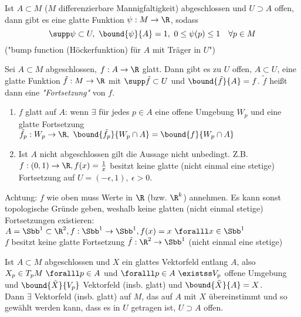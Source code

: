 \begin{lem}\lecture
	Ist $ A \subset M $ ($M$ differenzierbare Mannigfaltigkeit) abgeschlossen und $U \supset A$ offen, dann gibt es eine glatte Funktion $\psi: M \to \R$, sodass
	\[ \supp \psi \subset U,\ \bound{\psi}{A} = 1,\ 0 \leq \psi(p) \leq 1 \quad \forall p \in M \]
	("bump function (Höckerfunktion) für $A$ mit Träger in $U$")
\end{lem}

\begin{lem}
	Sei $A \subset M$ abgeschlossen, $ f: A \to \R $ glatt. Dann gibt es zu $U$ offen, $A \subset U$, eine glatte Funktion $\tilde{f}: M \to \R$ mit $ \supp \tilde{f} \subset U $ und $ \bound{\tilde{f}}{A} = f $. $\tilde{f}$ heißt dann eine \emph{"Fortsetzung"} von $f$.
\end{lem}

\begin{rem*}
	\begin{enumerate}[label={\roman*})]
		\item $f$ glatt auf $A$: wenn $\exists$ für jedes $p \in A$ eine offene Umgebung $W_p$ und eine glatte Fortsetzung $ \tilde{f}_p: W_p \to \R,\ \bound{\tilde{f}_p}{W_p \cap A} = \bound{f}{W_p\cap A} $
		\item Ist $A$ nicht abgeschlossen gilt die Aussage nicht unbedingt. Z.B. $ f:(0,1) \to \R, f(x) = \frac{1}{x} $ besitzt keine glatte (nicht einmal eine stetige) Fortsetzung auf $U = (-\epsilon,1),\ \epsilon > 0$.
	\end{enumerate}
\end{rem*}

\begin{rem*}
	Achtung: $f$ wie oben muss Werte in $\R$ (bzw. $\R^k$) annehmen. Es kann sonst topologische Gründe geben, weshalb keine glatten (nicht einmal stetige) Fortsetzungen existieren:\\
	$ A = \Sbb^1 \subset \R^2, f: \Sbb^1 \to \Sbb^1, f(x) = x \ \foralll x \in \Sbb^1 $\\
	$f$ besitzt keine glatte Fortsetzung $ \tilde{f}: \R^2 \to \Sbb^1 $ (nicht einmal eine stetige)
\end{rem*}

\begin{lem}
	Ist $ A \subset M $ abgeschlossen und $X$ ein glattes Vektorfeld entlang $A$, also $ X_p \in T_pM \ \foralll p \in A $ und $\foralll p \in A \ \existss V_p$ offene Umgebung und $ \bound{\tilde{X}}{V_p} $ Vektorfeld (insb. glatt) und $\bound{\tilde{X}}{A} = X$.\\
	Dann $\exists$ Vektorfeld (insb. glatt) auf $M$, das auf $A$ mit $X$ übereinstimmt und so gewählt werden kann, dass es in $U$ getragen ist, $U \supset A$ offen.
\end{lem}